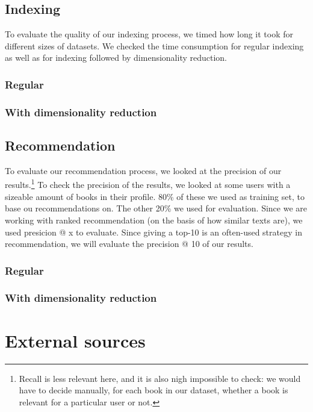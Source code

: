 \documentclass[10pt,a4paper]{paper}
\begin{document}
\subsection{Indexing}

To evaluate the quality of our indexing process, we timed how long it took for different sizes of datasets. We checked the time consumption for regular indexing as well as for indexing followed by dimensionality reduction. %
\subsubsection{Regular}


\subsubsection{With dimensionality reduction}



\subsection{Recommendation}

To evaluate our recommendation process, we looked at the precision of our results.\footnote{Recall is less relevant here, and it is also nigh impossible to check: we would have to decide manually, for each book in our dataset, whether a book is relevant for a particular user or not.}
To check the precision of the results, we looked at some users with a sizeable amount of books in their profile. 80\% of these we used as training set, to base ou recommendations on. The other 20\% we used for evaluation. Since we are working with ranked recommendation (on the basis of how similar texts are), we used presicion @ x to evaluate. Since giving a top-10 is an often-used strategy in recommendation, we will evaluate the precision @ 10 of our results. %


\subsubsection{Regular}


\subsubsection{With dimensionality reduction}


\section{External sources}
\end{document}
